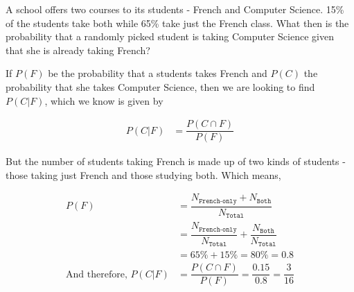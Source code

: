 

\question[2] A school offers two courses to its students - French and Computer Science. 
15\% of the students take both while 65\% take just the French class. What then is
the probability that a randomly picked student is taking Computer Science given
that she is already taking French?


\ifprintanswers
\fi 

\begin{solution}[\halfpage]
   If $P(F)$ be the probability that a students takes French and $P(C)$ the 
   probability that she takes Computer Science, then we are looking to find 
   $P(C \vert F)$, which we know is given by
   
   \begin{align}
      P(C \vert F) &= \dfrac{P(C \cap F)}{P(F)}
   \end{align}
   
   But the number of students taking French is made up of two kinds of students - 
   those taking just French and those studying both. Which means, 
   
   \begin{align}
       P(F) &= \dfrac{N_{\texttt{French-only}} + N_{\texttt{Both}}}{N_{\texttt{Total}}} \\ 
            &= \dfrac{N_{\texttt{French-only}}}{N_{\texttt{Total}}} + \dfrac{N_{\texttt{Both}}}{N_{\texttt{Total}}} \\
            &= 65\% + 15\% = 80\% = 0.8 \\
      \text{And therefore, } P(C\vert F) &= \dfrac{P(C \cap F)}{P(F)} = \dfrac{0.15}{0.8} = \dfrac{3}{16}
   \end{align}
\end{solution}
